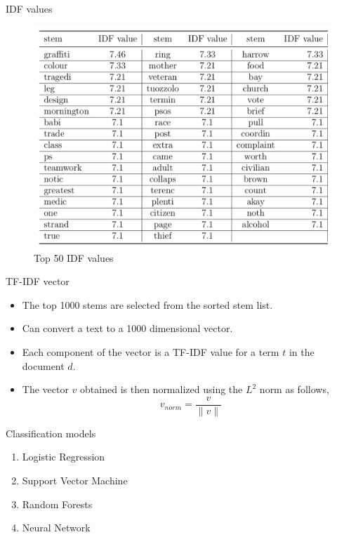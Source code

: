 \documentclass[12pt]{beamer}
\begin{document}
\begin{frame}{IDF values}
    \begin{figure}[h]
        \includegraphics[scale=0.225]{images/idf_values.png}
        \caption{Top 50 IDF values}
        \label{fig:idf_values}
    \end{figure}
\end{frame}

\begin{frame}{TF-IDF vector}
    \begin{itemize}
        \item The top 1000 stems are selected from the sorted stem list.
        \item Can convert a text to a 1000 dimensional vector.
        \item Each component of the vector is a TF-IDF value for a term $t$ in the document $d$.
        \item The vector $v$ obtained is then normalized using the $L^2$ norm as follows,
        \begin{equation}
            v_{norm} = \frac{v}{\lVert v \rVert}
        \end{equation}
    \end{itemize}
\end{frame}

\begin{frame}{Classification models}
    \begin{enumerate}
        \item Logistic Regression
        \item Support Vector Machine
        \item Random Forests
        \item Neural Network
    \end{enumerate}
\end{frame}
\end{document}
